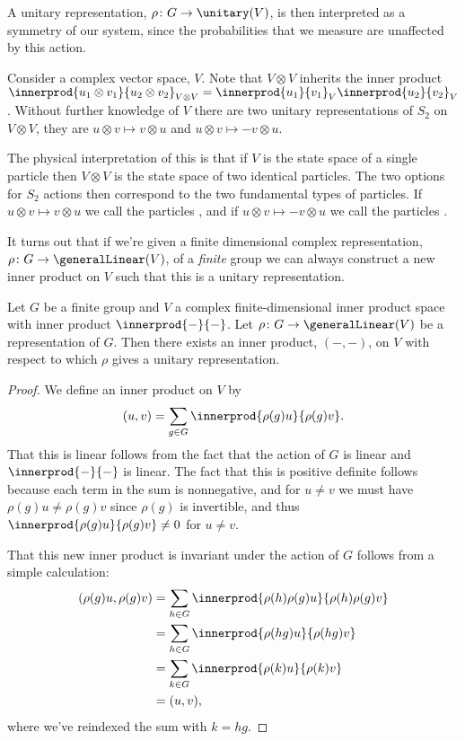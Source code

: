 A unitary representation, \(\rho \colon G \to \unitary(V)\), is then interpreted as a symmetry of our system, since the probabilities that we measure are unaffected by this action.

Consider a complex vector space, \(V\).
Note that \(V \otimes V\) inherits the inner product \(\innerprod{u_1 \otimes v_1}{u_2 \otimes v_2}_{V \otimes V} = \innerprod{u_1}{v_1}_V \innerprod{u_2}{v_2}_V\).
Without further knowledge of \(V\) there are two unitary representations of \(S_2\) on \(V \otimes V\), they are \(u \otimes v \mapsto v \otimes u\) and \(u \otimes v \mapsto -v \otimes u\).

The physical interpretation of this is that if \(V\) is the state space of a single particle then \(V \otimes V\) is the state space of two identical particles.
The two options for \(S_2\) actions then correspond to the two fundamental types of particles.
If \(u \otimes v \mapsto v \otimes u\) we call the particles , and if \(u \otimes v \mapsto -v \otimes u\) we call the particles .

It turns out that if we're given a finite dimensional complex representation, \(\rho \colon G \to \generalLinear(V)\), of a \emph{finite} group we can always construct a new inner product on \(V\) such that this is a unitary representation.

\begin{thm}{}{}
    Let \(G\) be a finite group and \(V\) a complex finite-dimensional inner product space with inner product \(\innerprod{-}{-}\).
    Let \(\rho \colon G \to \generalLinear(V)\) be a representation of \(G\).
    Then there exists an inner product, \((-,-)\), on \(V\) with respect to which \(\rho\) gives a unitary representation.
    \begin{proof}
        We define an inner product on \(V\) by
        \begin{equation}
            (u, v) = \sum_{g \in G} \innerprod{\rho(g)u}{\rho(g)v}.
        \end{equation}
        That this is linear follows from the fact that the action of \(G\) is linear and \(\innerprod{-}{-}\) is linear.
        The fact that this is positive definite follows because each term in the sum is nonnegative, and for \(u \ne v\) we must have \(\rho(g)u \ne \rho(g)v\) since \(\rho(g)\) is invertible, and thus \(\innerprod{\rho(g)u}{\rho(g)v} \ne 0\) for \(u \ne v\).
        
        That this new inner product is invariant under the action of \(G\) follows from a simple calculation:
        \begin{align}
            (\rho(g)u, \rho(g)v) &= \sum_{h \in G} \innerprod{\rho(h)\rho(g)u}{\rho(h)\rho(g)v}\\
            &= \sum_{h \in G} \innerprod{\rho(hg)u}{\rho(hg)v}\\
            &= \sum_{k \in G} \innerprod{\rho(k)u}{\rho(k)v}\\
            &= (u, v),
        \end{align}
        where we've reindexed the sum with \(k = hg\).
    \end{proof}
\end{thm}

